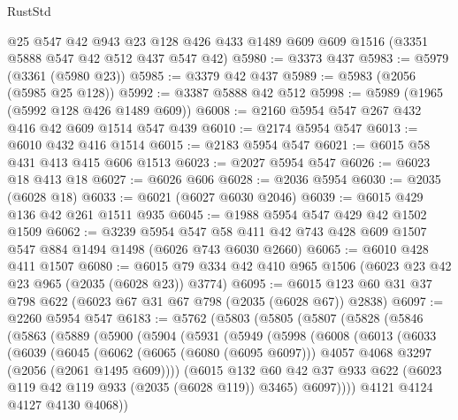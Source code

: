 \begin{lexlean}{RustStd}
\begin{coremodule}
    @25
    @547
    @42
    @943
    @23
    @128
    @426
    @433
    @1489
    @609
    @609
    @1516
    (@3351 @5888 @547 @42 @512 @437 @547 @42)
@5980 := @3373 @437
@5983 := @5979 (@3361 (@5980 @23))
@5985 := @3379 @42 @437
@5989 := @5983 (@2056 (@5985 @25 @128))
@5992 := @3387 @5888 @42 @512
@5998 := @5989 (@1965 (@5992 @128 @426 @1489 @609))
@6008 := @2160 @5954 @547 @267 @432 @416 @42 @609 @1514 @547 @439
@6010 := @2174 @5954 @547
@6013 := @6010 @432 @416 @1514
@6015 := @2183 @5954 @547
@6021 := @6015 @58 @431 @413 @415 @606 @1513
@6023 := @2027 @5954 @547
@6026 := @6023 @18 @413 @18
@6027 := @6026 @606
@6028 := @2036 @5954
@6030 := @2035 (@6028 @18)
@6033 := @6021 (@6027 @6030 @2046)
@6039 := @6015 @429 @136 @42 @261 @1511 @935
@6045 := @1988 @5954 @547 @429 @42 @1502 @1509
@6062 := @3239
    @5954
    @547
    @58
    @411
    @42
    @743
    @428
    @609
    @1507
    @547
    @884
    @1494
    @1498
    (@6026 @743 @6030 @2660)
@6065 := @6010 @428 @411 @1507
@6080 := @6015 @79 @334 @42 @410 @965 @1506 (@6023 @23 @42 @23 @965 (@2035 (@6028 @23)) @3774)
@6095 := @6015 @123 @60 @31 @37 @798 @622 (@6023 @67 @31 @67 @798 (@2035 (@6028 @67)) @2838)
@6097 := @2260 @5954 @547
@6183 := @5762
    (@5803
      (@5805
        (@5807
          (@5828
            (@5846
              (@5863
                (@5889
                  (@5900
                    (@5904
                      (@5931
                        (@5949
                          (@5998
                            (@6008
                              (@6013
                                (@6033
                                  (@6039
                                    (@6045
                                      (@6062
                                        (@6065 (@6080 (@6095 @6097)))
                                        @4057
                                        @4068
                                        @3297
                                        (@2056 (@2061 @1495 @609))))
                                    (@6015
                                      @132
                                      @60
                                      @42
                                      @37
                                      @933
                                      @622
                                      (@6023 @119 @42 @119 @933 (@2035 (@6028 @119)) @3465)
                                      @6097))))
                              @4121
                              @4124
                              @4127
                              @4130
                              @4068))

\end{coremodule}
\end{lexlean}
